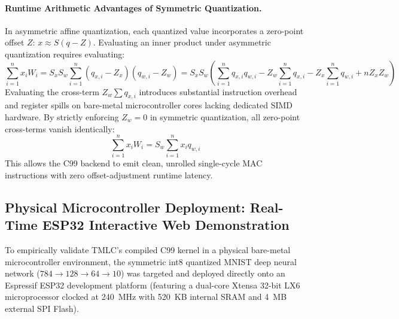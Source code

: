 \documentclass[11pt,a4paper]{article}
\begin{document}
\paragraph{Runtime Arithmetic Advantages of Symmetric Quantization.}
In asymmetric affine quantization, each quantized value incorporates a zero-point offset $Z$: $x \approx S (q - Z)$. Evaluating an inner product under asymmetric quantization requires evaluating:
\begin{equation}
\sum_{i=1}^n x_i W_i = S_x S_w \sum_{i=1}^n (q_{x,i} - Z_x)(q_{w,i} - Z_w) = S_x S_w \left( \sum_{i=1}^n q_{x,i} q_{w,i} - Z_w \sum_{i=1}^n q_{x,i} - Z_x \sum_{i=1}^n q_{w,i} + n Z_x Z_w \right)
\end{equation}
Evaluating the cross-term $Z_w \sum q_{x,i}$ introduces substantial instruction overhead and register spills on bare-metal microcontroller cores lacking dedicated SIMD hardware. By strictly enforcing $Z_w = 0$ in symmetric quantization, all zero-point cross-terms vanish identically:
\begin{equation}
\sum_{i=1}^n x_i W_i = S_w \sum_{i=1}^n x_i q_{w,i}
\end{equation}
This allows the C99 backend to emit clean, unrolled single-cycle MAC instructions with zero offset-adjustment runtime latency.

\subsection{Physical Microcontroller Deployment: Real-Time ESP32 Interactive Web Demonstration}
\label{sec:esp32_hardware_demo}

To empirically validate TMLC's compiled C99 kernel in a physical bare-metal microcontroller environment, the symmetric int8 quantized MNIST deep neural network ($784 \to 128 \to 64 \to 10$) was targeted and deployed directly onto an Espressif ESP32 development platform (featuring a dual-core Xtensa 32-bit LX6 microprocessor clocked at 240~MHz with 520~KB internal SRAM and 4~MB external SPI Flash).
\end{document}
